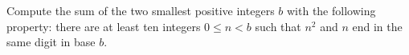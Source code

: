Compute the sum of the two smallest positive integers $b$ with the following property:
there are at least ten integers $0 \le n < b$ such that $n^2$ and $n$ end in the same digit in base $b$.